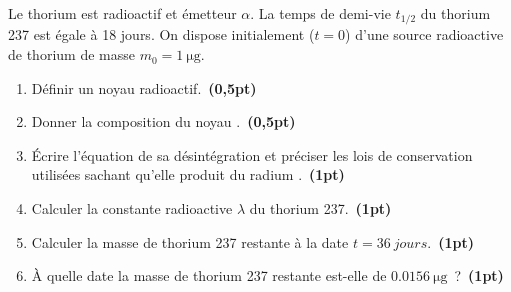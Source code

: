 Le thorium  est radioactif et émetteur $\alpha$. La temps de
demi-vie $t_{1/2}$ du thorium 237 est égale à 18 jours. On dispose initialement
($t=0$) d'une source radioactive de thorium de masse $m_{0}=\qty{1}{\ug}$.
\begin{enumerate}
    \item Définir un noyau radioactif.~\textbf{(0,5pt)}
    \item Donner la composition du noyau .~\textbf{(0,5pt)}
    \item Écrire l'équation de sa désintégration et préciser les lois de
          conservation utilisées sachant qu'elle produit du radium
          .~\textbf{(1pt)}
    \item Calculer la constante radioactive $\lambda$ du thorium
          237.~\textbf{(1pt)}
    \item Calculer la masse de thorium 237 restante à la date
          $t=\qty{36}{jours}$.~\textbf{(1pt)}
    \item À quelle date la masse de thorium 237 restante est-elle de
          $\qty{0.0156}{\ug}$~?~\textbf{(1pt)}
\end{enumerate}

